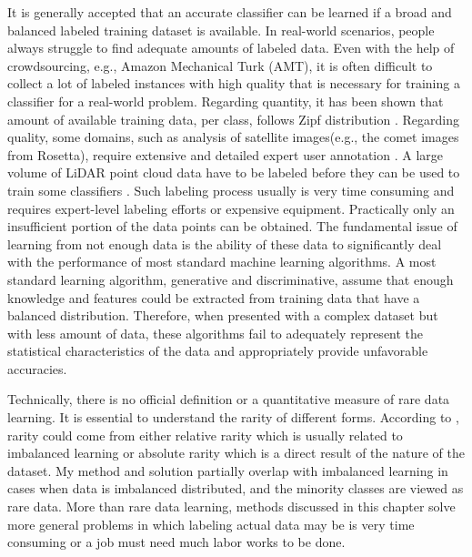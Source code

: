 \documentclass{iitthesis}
\begin{document}
 \label{chapter: data space}

 \label{dataspace: introduction}

It is generally accepted that an accurate classifier can be learned if a broad and balanced labeled training dataset is available. In real-world scenarios, people always struggle to find adequate amounts of labeled data. Even with the help of crowdsourcing, e.g., Amazon Mechanical Turk (AMT), it is often difficult to collect a lot of labeled instances with high quality that is necessary for training a classifier for a real-world problem. Regarding quantity, it has been shown that amount of available training data, per class, follows Zipf distribution \cite{torralba2011app_share}. Regarding quality, some domains, such as analysis of satellite images(e.g., the comet images from Rosetta), require extensive and detailed expert user annotation \cite{remotesensing2013}. A large volume of LiDAR point cloud data have to be labeled before they can be used to train some classifiers \cite{ZX:14}. Such labeling process usually is very time consuming and requires expert-level labeling efforts or expensive equipment. Practically only an insufficient portion of the data points can be obtained. The fundamental issue of learning from not enough data is the ability of these data to significantly deal with the performance of most standard machine learning algorithms. A most standard learning algorithm, generative and discriminative, assume that enough knowledge and features could be extracted from training data that have a balanced distribution. Therefore, when presented with a complex dataset but with less amount of data, these algorithms fail to adequately represent the statistical characteristics of the data and appropriately provide unfavorable accuracies.

Technically, there is no official definition or a quantitative measure of rare data learning. It is essential to understand the rarity of different forms. According to \cite{Weiss}, rarity could come from either relative rarity which is usually related to imbalanced learning or absolute rarity which is a direct result of the nature of the dataset. My method and solution partially overlap with imbalanced learning in cases when data is imbalanced distributed, and the minority classes are viewed as rare data. More than rare data learning, methods discussed in this chapter solve more general problems in which labeling actual data may be is very time consuming or a job must need much labor works to be done. 
\end{document}
